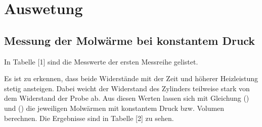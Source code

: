 \section{Auswetung}
\subsection{Messung der Molwärme bei konstantem Druck}
In Tabelle [1] sind die Messwerte der ersten Messreihe gelistet.

Es ist zu erkennen, dass beide Widerstände mit der Zeit und höherer Heizleistung
stetig ansteigen. Dabei weicht der Widerstand des Zylinders teilweise stark von dem
Widerstand der Probe ab.
Aus diesen Werten lassen sich mit Gleichung () und () die jeweiligen Molwärmen mit
konstantem Druck bzw. Volumen berechnen. Die Ergebnisse sind in Tabelle [2] zu sehen.
